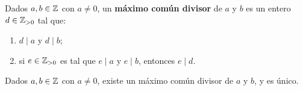 \documentclass[12pt,a4paper]{book}
\begin{document}
    \begin{definicion}
        \label{def:mcd-Z}
        Dados $a,b\in\mathbb{Z}$ con $a\neq0$, un \textbf{máximo común divisor} de $a$ y $b$ es un entero $d\in\mathbb{Z}_{>0}$ tal que:
        \begin{enumerate}
            \item[(1)] $d\mid a$ y $d\mid b$;
            \item[(2)] si $e\in\mathbb{Z}_{>0}$ es tal que $e\mid a$ y $e\mid b$, entonces $e\mid d$.
        \end{enumerate}
    \end{definicion}

    \begin{teorema}
        \label{thm:existencia-mcd-Z}
        Dados $a,b\in\mathbb{Z}$ con $a\neq0$, existe un máximo común divisor de $a$ y $b$, y es único.
    \end{teorema}
\end{document}
